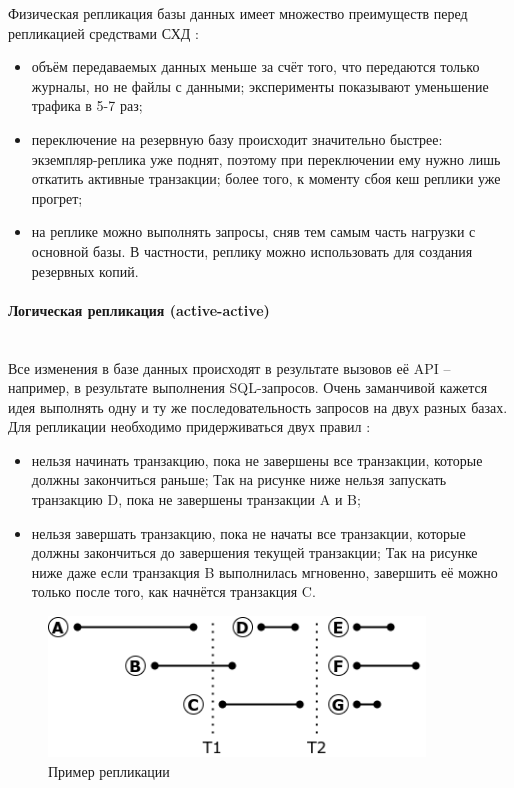 Физическая репликация базы данных имеет множество преимуществ перед репликацией средствами СХД \autocite{PhysLogPeplic}:
\begin{itemize}
    \item объём передаваемых данных меньше за счёт того, что передаются только журналы, но не файлы с данными; эксперименты показывают уменьшение трафика в 5-7 раз;
    \item переключение на резервную базу происходит значительно быстрее: экземпляр-реплика уже поднят, поэтому при переключении ему нужно лишь откатить активные транзакции; более того, к моменту сбоя кеш реплики уже прогрет;
    \item на реплике можно выполнять запросы, сняв тем самым часть нагрузки с основной базы. В частности, реплику можно использовать для создания резервных копий.
\end{itemize}

\paragraph{Логическая репликация (active-active)} ~\\
Все изменения в базе данных происходят в результате вызовов её API – например, в результате выполнения SQL-запросов.
Очень заманчивой кажется идея выполнять одну и ту же последовательность запросов на двух разных базах. Для репликации
необходимо придерживаться двух правил \autocite{PhysLogPeplic}:
\begin{itemize}
    \item нельзя начинать транзакцию, пока не завершены все транзакции, которые должны закончиться раньше; Так на рисунке ниже нельзя запускать транзакцию D, пока не завершены транзакции A и B;
    \item нельзя завершать транзакцию, пока не начаты все транзакции, которые должны закончиться до завершения текущей транзакции; Так на рисунке ниже даже если транзакция B выполнилась мгновенно, завершить её можно только после того, как начнётся транзакция C.
\end{itemize}

\begin{figure}[H]
    \centering
    \includegraphics[width=100mm]{assets/distributed/ReplicationExample}
    \caption{Пример репликации}
    \label{fig:ReplicationExample}
\end{figure}

